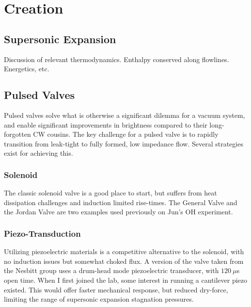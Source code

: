 \ifx\justbeingincluded\undefined


\fi

\chapter{Creation}


\section{Supersonic Expansion}

Discussion of relevant thermodynamics. Enthalpy conserved along flowlines. Energetics, etc.

\section{Pulsed Valves}

Pulsed valves solve what is otherwise a significant dilemma for a vacuum system, and enable significant improvements in brightness compared to their long-forgotten CW cousins.
The key challenge for a pulsed valve is to rapidly transition from leak-tight to fully formed, low impedance flow.
Several strategies exist for achieving this.

\subsection{Solenoid}

The classic solenoid valve is a good place to start, but suffers from heat dissipation challenges and induction limited rise-times.
The General Valve and the Jordan Valve are two examples used previously on Jun's OH experiment.

\subsection{Piezo-Transduction}

Utilizing piezoelectric materials is a competitive alternative to the solenoid, with no induction issues but somewhat choked flux.
A version of the valve taken from the Nesbitt group uses a drum-head mode piezoelectric transducer, with $120~\mu$s open time.
When I first joined the lab, some interest in running a cantilever piezo existed.
This would offer faster mechanical response, but reduced dry-force, limiting the range of supersonic expansion stagnation pressures.

